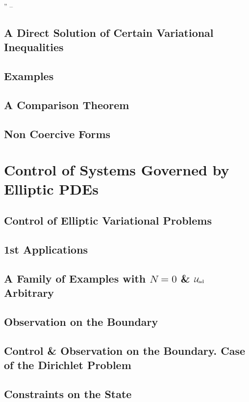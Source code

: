 \documentclass[oneside]{book}
\numberwithin{equation}{section}
\begin{document}
'' -- \cite[pp. 9--]{Lions1971}

\subsection{A Direct Solution of Certain Variational Inequalities}

\subsection{Examples}

\subsection{A Comparison Theorem}

\subsection{Non Coercive Forms}

\section{Control of Systems Governed by Elliptic PDEs}

\subsection{Control of Elliptic Variational Problems}

\subsection{1st Applications}

\subsection{A Family of Examples with $N = 0$ \& $\mathcal{U}_{\rm ad}$ Arbitrary}

\subsection{Observation on the Boundary}

\subsection{Control \& Observation on the Boundary. Case of the Dirichlet Problem}

\subsection{Constraints on the State}
\end{document}
